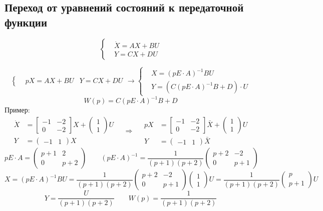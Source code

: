 \subsection{Переход от уравнений состояний к передаточной функции}
\[
  \left\{\begin{aligned} & \dot X = AX + BU \\
  & Y = CX + DU\end{aligned}\right. 
\] 

\[
  \left\{\begin{aligned} & pX = AX + BU
  & Y = CX + DU \end{aligned}\right.  \rightarrow \left\{\begin{aligned} & X =
  (pE \cdot A)^{-1}BU \\ & Y = (C(pE \cdot A)^{-1}B +D)\cdot U \end{aligned}\right. 
\] 
\[
W(p) = C(pE \cdot A)^{-1}B + D
\] 
Пример:
\[
\begin{aligned}
   \dot X &=  \begin{bmatrix} -1 & -2 \\ 0 & -2 \end{bmatrix} X + \begin{pmatrix}
1 \\ 1\end{pmatrix} U \\
   Y &= \begin{pmatrix} -1 & 1 \end{pmatrix} X
\end{aligned}
\quad \Rightarrow \quad
\begin{aligned}
 pX &= \begin{bmatrix} -1 & -2 \\ 0 & -2 \end{bmatrix} \bar X + \begin{pmatrix}
 1 \\ 1 \end{pmatrix} U \\
 Y &= \begin{pmatrix} -1 & 1 \end{pmatrix} \bar X
\end{aligned}
\]
\bigskip
\[
  pE\cdot A = \begin{pmatrix} p+1 & 2 \\ 0 & p+2 \end{pmatrix} \qquad (pE\cdot
  A)^{-1} = \frac{1}{(p+1)(p+2)}\begin{pmatrix} p+2 & -2 \\ 0 & p+1 \end{pmatrix}
\] 
\bigskip
\[
  X = (pE \cdot A)^{-1}BU = \frac{1}{(p+1)(p+2)}\begin{pmatrix} p+2 & -2 \\ 0 &
  p+1 \end{pmatrix} \begin{pmatrix} 1 \\ 1 \end{pmatrix} U =
  \frac{1}{(p+1)(p+2)} \begin{pmatrix} p \\ p+1 \end{pmatrix} U
\] 
\bigskip
\[
Y = \frac{U}{(p+1)(p+2)} \qquad W(p) = \frac{1}{(p+1)(p+2)}
\] 

